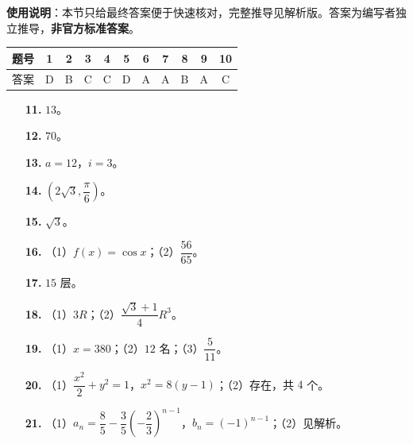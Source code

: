 
\begin{gknotice}
\textbf{使用说明}：本节只给最终答案便于快速核对，完整推导见解析版。答案为编写者独立推导，\textbf{非官方标准答案}。
\end{gknotice}

\begin{center}\begin{tabular}{ccccccccccc}
\toprule
题号 & 1 & 2 & 3 & 4 & 5 & 6 & 7 & 8 & 9 & 10 \\
\midrule
答案 & D & B & C & C & D & A & A & B & A & C \\
\bottomrule
\end{tabular}\end{center}

\begin{itemize}[leftmargin=2.6em]
  \item[\textbf{11.}] $13$。
  \item[\textbf{12.}] $70$。
  \item[\textbf{13.}] $a=12$，$i=3$。
  \item[\textbf{14.}] $\left(2\sqrt3,\dfrac{\pi}6\right)$。
  \item[\textbf{15.}] $\sqrt3$。
\end{itemize}

\begin{itemize}[leftmargin=2.6em]
  \item[\textbf{16.}] （1）$f(x)=\cos x$；（2）$\dfrac{56}{65}$。
  \item[\textbf{17.}] $15$ 层。
  \item[\textbf{18.}] （1）$3R$；（2）$\dfrac{\sqrt3+1}4R^3$。
  \item[\textbf{19.}] （1）$x=380$；（2）$12$ 名；（3）$\dfrac5{11}$。
  \item[\textbf{20.}] （1）$\dfrac{x^2}2+y^2=1$，$x^2=8(y-1)$；（2）存在，共 $4$ 个。
  \item[\textbf{21.}] （1）$a_n=\dfrac85-\dfrac35\left(-\dfrac23\right)^{n-1}$，$b_n=(-1)^{n-1}$；（2）见解析。
\end{itemize}
